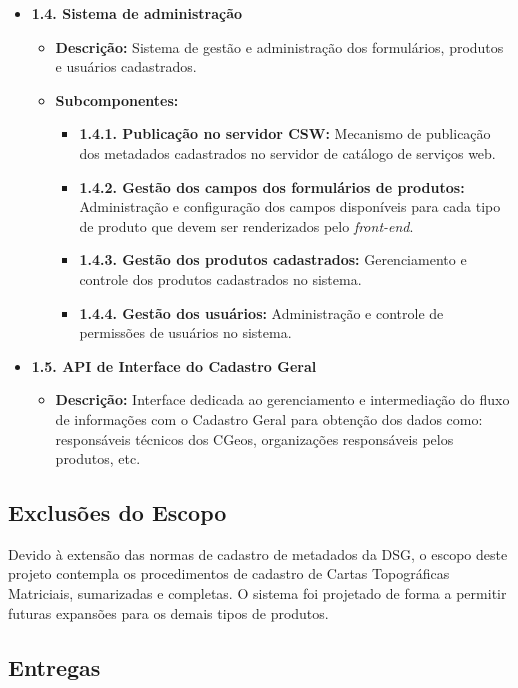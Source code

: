 \begin{itemize}
    \item \textbf{1.4. Sistema de administração}
    \begin{itemize}
        \item \textbf{Descrição:} Sistema de gestão e administração dos formulários, produtos e usuários cadastrados.
        \item \textbf{Subcomponentes:}
        \begin{itemize}
            \item \textbf{1.4.1. Publicação no servidor CSW:} Mecanismo de publicação dos metadados cadastrados no servidor de catálogo de serviços web.
            \item \textbf{1.4.2. Gestão dos campos dos formulários de produtos:} Administração e configuração dos campos disponíveis para cada tipo de produto que devem ser renderizados pelo \textit{front-end}.
            \item \textbf{1.4.3. Gestão dos produtos cadastrados:} Gerenciamento e controle dos produtos cadastrados no sistema.
            \item \textbf{1.4.4. Gestão dos usuários:} Administração e controle de permissões de usuários no sistema.
        \end{itemize}
    \end{itemize}

    \item \textbf{1.5. API de Interface do Cadastro Geral}
    \begin{itemize}
        \item \textbf{Descrição:} Interface dedicada ao gerenciamento e intermediação do fluxo de informações com o Cadastro Geral para obtenção dos dados como: responsáveis técnicos dos CGeos, organizações responsáveis pelos produtos, etc.
    \end{itemize}
\end{itemize}
\subsection{Exclusões do Escopo}
Devido à extensão das normas de cadastro de metadados da DSG, o escopo deste projeto contempla os procedimentos de cadastro de Cartas Topográficas Matriciais, sumarizadas e completas. O sistema foi projetado de forma a permitir futuras expansões para os demais tipos de produtos.

\subsection{Entregas}

